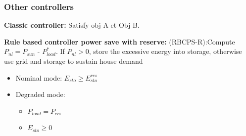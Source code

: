 \documentclass{beamer}
\begin{document}
\begin{frame}
\frametitle{Other controllers}
\textbf{Classic controller:} Satisfy obj A et Obj B.
\vspace{10pt}

\textbf{Rule based controller power save with reserve:} (RBCPS-R):Compute $P_{nl} = P_{sun}$ - $P_{load}^*$. If $P_{nl}>0$, store the excessive energy into storage, otherwise use grid and storage to sustain house demand\begin{itemize}
    \item Nominal mode: $E_{sto}\geq E_{sto}^{res} $
    \item Degraded mode: \begin{itemize}
        \item $P_{load} = P_{cri}$
        \item $E_{sto}\geq 0 $
    \end{itemize}
\end{itemize}
\end{frame}
\end{document}
